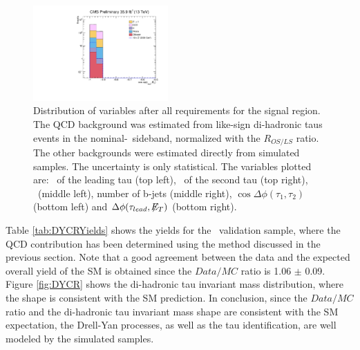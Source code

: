 \begin{figure}[H]
\begin{center}
 \includegraphics[clip,width=0.46\textwidth]{figuras/Chapter5/SR_Plots/cosTauMET.pdf} \hfill
 \end{center}
 \caption{Distribution of variables after all requirements for the signal region. The QCD 
 background was estimated from like-sign di-hadronic taus events in the 
 nominal-\MET~sideband, normalized with the $R_{OS/LS}$ ratio. The other backgrounds were estimated 
 directly from simulated samples. The uncertainty is only statistical. The variables plotted are:
 \pt~of the leading tau (top left),  \pt~of the second tau (top right), \MET~(middle left), number of b-jets (middle right), 
 $\cos\Delta \phi (\tau_{1},\tau_{2})$ (bottom left) and $\Delta \phi (\tau_{lead}, \not\!\!E_T)$ (bottom right).}
\label{fig:SignalRegionPlots}
 \end{figure}


\noindent Table \ref{tab:DYCRYields} shows the yields for the \Ztotauh~validation 
sample, where the QCD contribution has been determined using the method 
discussed in the previous section. Note that a good 
agreement between the data and the expected overall yield of 
the SM  is obtained since the $Data/MC$ ratio 
is 1.06 $\pm$ 0.09. Figure \ref{fig:DYCR} shows the di-hadronic tau 
invariant mass distribution, where the shape is consistent
with the SM prediction. In conclusion, since the $Data/MC$ ratio and 
the di-hadronic tau invariant mass shape are consistent with 
the SM expectation, the Drell-Yan processes, as well as the tau identification, 
are well modeled by the simulated samples.

